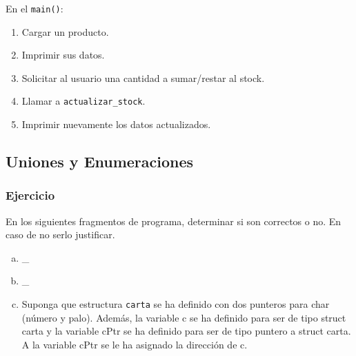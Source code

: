 En el \texttt{main()}:

\begin{enumerate}
\item Cargar un producto.
\item Imprimir sus datos.
\item Solicitar al usuario una cantidad a sumar/restar al stock.
\item Llamar a \texttt{actualizar\_stock}.
\item Imprimir nuevamente los datos actualizados.
\end{enumerate}

\subsection*{Uniones y Enumeraciones}

\subsubsection{Ejercicio}
En los siguientes fragmentos de programa, determinar si son correctos o no. En caso de no serlo justificar.
\begin{enumerate}[a)]
  \item \_
  \lstset{inputencoding=utf8/latin1}
  
  \item \_
  \lstset{inputencoding=utf8/latin1}
  
  \item Suponga que estructura \texttt{carta} se ha definido con dos punteros para char (número y palo).
    Además, la variable c se ha definido para ser de tipo struct carta y la variable cPtr se ha definido para ser de tipo puntero a struct carta. 
    A la variable cPtr se le ha asignado la dirección de c.
  \lstset{inputencoding=utf8/latin1}
  
\end{enumerate}

